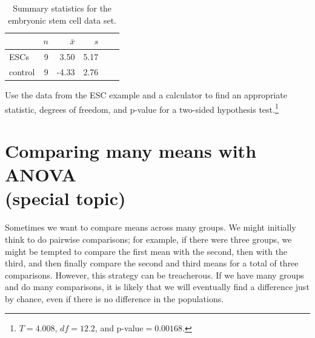 \begin{table}
\centering
\begin{tabular}{l rrrrr}
\hline
\hspace{10mm}	& $n$	& $\bar{x}$	& $s$  	 \\
\hline
ESCs		& 9		& 3.50		& 5.17  	\\
control		& 9		& -4.33		& 2.76  	 \\
\hline
\end{tabular}
\caption{Summary statistics for the embryonic stem cell data set.}
\label{summaryStatsForSheepHeartDataWhoReceivedMiceESCsForCalcSubsection}
\end{table}

\begin{exercise}Use the data from the ESC example and a calculator to find an appropriate statistic, degrees of freedom, and p-value for a two-sided hypothesis test.\footnote{$T=4.008$, $df=12.2$, and p-value$=0.00168$.}
\end{exercise}



\section[Comparing many means with ANOVA (special topic)]{Comparing many means with ANOVA\\(special topic)}
\label{anovaAndRegrWithCategoricalVariables}


Sometimes we want to compare means across many groups. We might initially think to do pairwise comparisons; for example, if there were three groups, we might be tempted to compare the first mean with the second, then with the third, and then finally compare the second and third means for a total of three comparisons. However, this strategy can be treacherous. If we have many groups and do many comparisons, it is likely that we will eventually find a difference just by chance, even if there is no difference in the populations.

